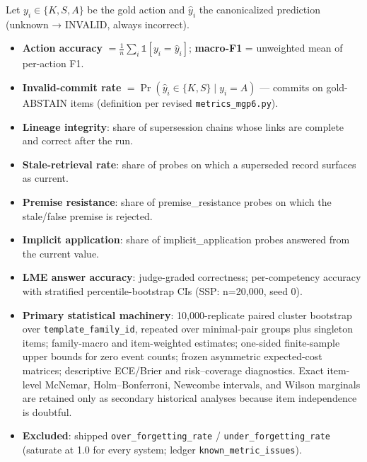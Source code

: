 Let \(y_i \in \{K, S, A\}\) be the gold action and \(\hat y_i\) the
canonicalized prediction (unknown → INVALID, always incorrect).

\begin{itemize}
\tightlist
\item
  \textbf{Action accuracy}
  \(= \frac{1}{n}\sum_i \mathbb{1}[y_i = \hat y_i]\); \textbf{macro-F1}
  = unweighted mean of per-action F1.
\item
  \textbf{Invalid-commit rate}
  \(= \Pr(\hat y_i \in \{K, S\} \mid y_i = A)\) --- commits on
  gold-ABSTAIN items (definition per revised \texttt{metrics\_mgp6.py}).
\item
  \textbf{Lineage integrity}: share of supersession chains whose links
  are complete and correct after the run.
\item
  \textbf{Stale-retrieval rate}: share of probes on which a superseded
  record surfaces as current.
\item
  \textbf{Premise resistance}: share of premise\_resistance probes on
  which the stale/false premise is rejected.
\item
  \textbf{Implicit application}: share of implicit\_application probes
  answered from the current value.
\item
  \textbf{LME answer accuracy}: judge-graded correctness; per-competency
  accuracy with stratified percentile-bootstrap CIs (SSP: n=20,000, seed
  0).
\item
  \textbf{Primary statistical machinery}: 10,000-replicate paired
  cluster bootstrap over \texttt{template\_family\_id}, repeated over
  minimal-pair groups plus singleton items; family-macro and
  item-weighted estimates; one-sided finite-sample upper bounds for zero
  event counts; frozen asymmetric expected-cost matrices; descriptive
  ECE/Brier and risk--coverage diagnostics. Exact item-level McNemar,
  Holm--Bonferroni, Newcombe intervals, and Wilson marginals are
  retained only as secondary historical analyses because item
  independence is doubtful.
\item
  \textbf{Excluded}: shipped \texttt{over\_forgetting\_rate} /
  \texttt{under\_forgetting\_rate} (saturate at 1.0 for every system;
  ledger \texttt{known\_metric\_issues}).
\end{itemize}
